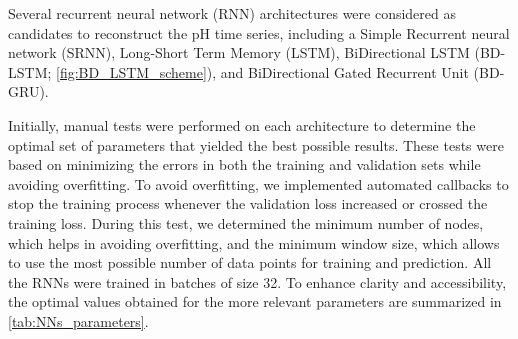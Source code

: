 Several recurrent neural network (RNN) architectures were considered as
candidates to reconstruct the pH time series, including a Simple Recurrent
neural network (SRNN), Long-Short Term Memory (LSTM), BiDirectional LSTM
(BD-LSTM; \cref{fig:BD_LSTM_scheme}), and BiDirectional Gated Recurrent Unit
(BD-GRU).

Initially, manual tests were performed on each architecture to determine
the optimal set of parameters that yielded the best possible results. These
tests were based on minimizing the errors in both the training and validation
sets while avoiding overfitting. To avoid overfitting, we implemented automated
callbacks to stop the training process whenever the validation loss increased
or crossed the training loss. During this test, we determined the minimum
number of nodes, which helps in avoiding overfitting, and the minimum window
size, which allows to use the most possible number of data points for training
and prediction. All the RNNs were trained in batches of size 32. To enhance
clarity and accessibility, the optimal values obtained for the more relevant
parameters are summarized in \cref{tab:NNs_parameters}.
\begin{table}[H]
    \centering
    \caption[Optimal parameters used for the different RNN
        architectures]{Optimal parameters used for the different RNN
        architectures}
    \label{tab:NNs_parameters}
\end{table}

